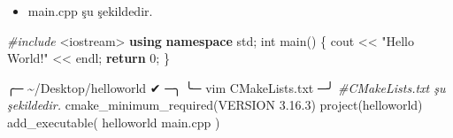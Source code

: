\documentclass[
]{book}
\newenvironment{Shaded}{\begin{snugshade}}{\end{snugshade}}
\newcommand{\CommentTok}[1]{\textcolor[rgb]{0.56,0.35,0.01}{\textit{#1}}}
\newcommand{\ControlFlowTok}[1]{\textcolor[rgb]{0.13,0.29,0.53}{\textbf{#1}}}
\newcommand{\DataTypeTok}[1]{\textcolor[rgb]{0.13,0.29,0.53}{#1}}
\newcommand{\DecValTok}[1]{\textcolor[rgb]{0.00,0.00,0.81}{#1}}
\newcommand{\ExtensionTok}[1]{#1}
\newcommand{\ImportTok}[1]{#1}
\newcommand{\KeywordTok}[1]{\textcolor[rgb]{0.13,0.29,0.53}{\textbf{#1}}}
\newcommand{\NormalTok}[1]{#1}
\newcommand{\PreprocessorTok}[1]{\textcolor[rgb]{0.56,0.35,0.01}{\textit{#1}}}
\newcommand{\StringTok}[1]{\textcolor[rgb]{0.31,0.60,0.02}{#1}}
\providecommand{\tightlist}{%
  \setlength{\itemsep}{0pt}\setlength{\parskip}{0pt}}
\begin{document}
\begin{itemize}
\tightlist
\item
  main.cpp şu şekildedir.
\end{itemize}

\begin{Shaded}
\begin{Highlighting}[]
   \PreprocessorTok{\#include }\ImportTok{<iostream>}
   \KeywordTok{using} \KeywordTok{namespace}\NormalTok{ std;}
   \DataTypeTok{int}\NormalTok{ main() \{}
\NormalTok{        cout << }\StringTok{"Hello World!"}\NormalTok{ << endl;}
        \ControlFlowTok{return} \DecValTok{0}\NormalTok{;}
\NormalTok{   \}}
\end{Highlighting}
\end{Shaded}

\begin{Shaded}
\begin{Highlighting}[]
\NormalTok{╭─ }\ExtensionTok{\textasciitilde{}/Desktop/helloworld}\NormalTok{                                                   ✔ ─╮}
\NormalTok{╰─ }\ExtensionTok{vim}\NormalTok{ CMakeLists.txt                                                       ─╯}
   \CommentTok{\#CMakeLists.txt şu şekildedir.}
   \ExtensionTok{cmake\_minimum\_required}\NormalTok{(VERSION 3.16.3)}
   \ExtensionTok{project}\NormalTok{(helloworld)}
   \ExtensionTok{add\_executable}\NormalTok{(}
       \ExtensionTok{helloworld}
        \ExtensionTok{main.cpp}
\NormalTok{   )}
\end{Highlighting}
\end{Shaded}
\end{document}
